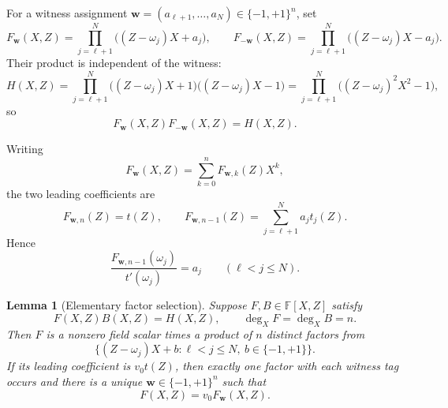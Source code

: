 \documentclass[11pt]{article}
\newtheorem{lemma}[theorem]{Lemma}
\theoremstyle{definition}
\newcommand{\F}{\mathbb F}
\begin{document}
For a witness assignment
$\mathbf w=(a_{\ell+1},\ldots,a_N)\in \{-1,+1\}^n$, set
\begin{equation}
  F_{\mathbf w}(X,Z)
  =\prod_{j=\ell+1}^{N}\bigl((Z-\omega_j)X+a_j\bigr),
  \qquad
  F_{-\mathbf w}(X,Z)
  =\prod_{j=\ell+1}^{N}\bigl((Z-\omega_j)X-a_j\bigr).
  \label{eq:fsp-selected-factors}
\end{equation}
Their product is independent of the witness:
\begin{equation}
  H(X,Z)
  =\prod_{j=\ell+1}^{N}
    \bigl((Z-\omega_j)X+1\bigr)\bigl((Z-\omega_j)X-1\bigr)
  =\prod_{j=\ell+1}^{N}\bigl((Z-\omega_j)^2X^2-1\bigr),
  \label{eq:fsp-fixed-H}
\end{equation}
so
\begin{equation}
  F_{\mathbf w}(X,Z)F_{-\mathbf w}(X,Z)=H(X,Z).
  \label{eq:fsp-complement-product}
\end{equation}

Writing
\[
  F_{\mathbf w}(X,Z)=\sum_{k=0}^{n}F_{\mathbf w,k}(Z)X^k,
\]
the two leading coefficients are
\begin{equation}
  F_{\mathbf w,n}(Z)=t(Z),
  \qquad
  F_{\mathbf w,n-1}(Z)
  =\sum_{j=\ell+1}^{N}a_jt_j(Z).
  \label{eq:fsp-top-coefficients}
\end{equation}
Hence
\begin{equation}
  \frac{F_{\mathbf w,n-1}(\omega_j)}{t'(\omega_j)}=a_j
  \qquad(\ell<j\le N).
  \label{eq:fsp-recover-witness}
\end{equation}

\begin{lemma}[Elementary factor selection]
\label{lem:factor-selection}
Suppose $F,B\in\F[X,Z]$ satisfy
\[
  F(X,Z)B(X,Z)=H(X,Z),
  \qquad
  \deg_XF=\deg_XB=n.
\]
Then $F$ is a nonzero field scalar times a product of $n$ distinct factors
from
\[
  \bigl\{(Z-\omega_j)X+b:\ell<j\le N,\ b\in\{-1,+1\}\bigr\}.
\]
If its leading coefficient is $v_0t(Z)$, then exactly one factor with each
witness tag occurs and there is a unique
$\mathbf w\in\{-1,+1\}^n$ such that
\[
  F(X,Z)=v_0F_{\mathbf w}(X,Z).
\]
\end{lemma}
\end{document}
